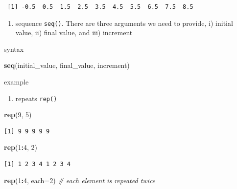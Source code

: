 \documentclass[
]{book}
\newenvironment{Shaded}{\begin{snugshade}}{\end{snugshade}}
\newcommand{\CommentTok}[1]{\textcolor[rgb]{0.56,0.35,0.01}{\textit{#1}}}
\newcommand{\DataTypeTok}[1]{\textcolor[rgb]{0.13,0.29,0.53}{#1}}
\newcommand{\DecValTok}[1]{\textcolor[rgb]{0.00,0.00,0.81}{#1}}
\newcommand{\KeywordTok}[1]{\textcolor[rgb]{0.13,0.29,0.53}{\textbf{#1}}}
\newcommand{\NormalTok}[1]{#1}
\newcommand{\OperatorTok}[1]{\textcolor[rgb]{0.81,0.36,0.00}{\textbf{#1}}}
\providecommand{\tightlist}{%
  \setlength{\itemsep}{0pt}\setlength{\parskip}{0pt}}
\begin{document}
\begin{verbatim}
 [1] -0.5  0.5  1.5  2.5  3.5  4.5  5.5  6.5  7.5  8.5
\end{verbatim}

\begin{enumerate}
\def\labelenumi{\arabic{enumi}.}
\setcounter{enumi}{1}
\tightlist
\item
  sequence \texttt{seq()}. There are three arguments we need to provide, i) initial value, ii) final value, and iii) increment
\end{enumerate}

syntax

\begin{Shaded}
\begin{Highlighting}[]
\KeywordTok{seq}\NormalTok{(initial_value, final_value, increment)}
\end{Highlighting}
\end{Shaded}

example

\begin{enumerate}
\def\labelenumi{\arabic{enumi}.}
\setcounter{enumi}{2}
\tightlist
\item
  repeats \texttt{rep()}
\end{enumerate}

\begin{Shaded}
\begin{Highlighting}[]
\KeywordTok{rep}\NormalTok{(}\DecValTok{9}\NormalTok{, }\DecValTok{5}\NormalTok{)}
\end{Highlighting}
\end{Shaded}

\begin{verbatim}
[1] 9 9 9 9 9
\end{verbatim}

\begin{Shaded}
\begin{Highlighting}[]
\KeywordTok{rep}\NormalTok{(}\DecValTok{1}\OperatorTok{:}\DecValTok{4}\NormalTok{, }\DecValTok{2}\NormalTok{)}
\end{Highlighting}
\end{Shaded}

\begin{verbatim}
[1] 1 2 3 4 1 2 3 4
\end{verbatim}

\begin{Shaded}
\begin{Highlighting}[]
\KeywordTok{rep}\NormalTok{(}\DecValTok{1}\OperatorTok{:}\DecValTok{4}\NormalTok{, }\DataTypeTok{each=}\DecValTok{2}\NormalTok{) }\CommentTok{# each element is repeated twice}
\end{Highlighting}
\end{Shaded}
\end{document}
